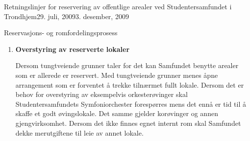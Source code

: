 \begin{instruks}{Retningslinjer for reservering av offentlige arealer
    ved Studentersamfundet i Trondhjem}{29. juli, 2009}{3. desember, 2009}
\begin{instruksledd}{Reservasjons- og romfordelingsprosess}
\begin{enumerate}
                I etterkant av semesterets rombookingsmøte kan Kontrollkontoret
                fortløpende reservere rom
                til interesserte.
                \begin{enumerate}
                    \item  Ledige lokaler tildeles i henhold til normer for
                        prioritering.
                    \item Utlån/-leie skal vanligvis ikke gå på bekostning av interne
                        romreservasjoner. Punkt 5.3 beskriver
                        retningslinjer ved overstyring av reserverte lokaler.
                    \item Romutlån til eksterne arrangementer som ikke står i
                        semesterprogrammet fastsettes endelig to uker før
                        arrangementet.
                    \item Romutleie som ikke står i semesterprogrammet kan fastsettes
                        to måneder før arrangementet dersom særlige
                        grunner taler for det.
                    \item Endringer og informasjon om ledige arealer skal til enhver
                        tid ligge oppdatert på robokop.samfundet.no.
                \end{enumerate}

            \item \textbf{Overstyring av reserverte lokaler}

                Dersom tungtveiende grunner taler for det kan Samfundet benytte
                arealer som er allerede er reservert. Med
                tungtveiende grunner menes åpne arrangement som er forventet å trekke
                tilnærmet fullt lokale. Dersom det er behov
                for overstyring av eksempelvis orkesterøvinger skal
                Studentersamfundets Symfoniorchester forespørres mens det ennå
                er tid til å skaffe et godt øvingslokale. Det samme gjelder korøvinger
                og annen gjengvirksomhet. Dersom det ikke
                finnes egnet internt rom skal Samfundet dekke merutgiftene til leie av
                annet lokale.
        \end{enumerate}

    \end{instruksledd}


\end{instruks}
